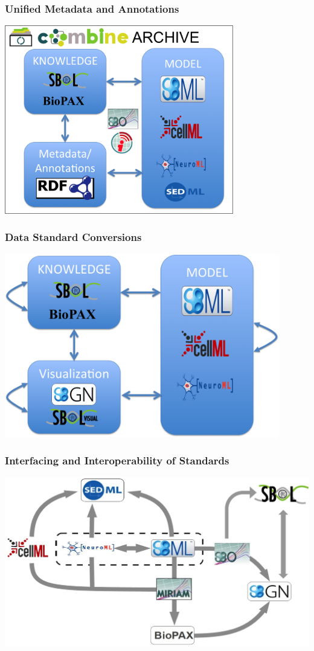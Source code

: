 \documentclass{beamer}
\begin{document}
\begin{frame}\frametitle{Unified Metadata and Annotations}
	\begin{center}
	\includegraphics[width=0.75\textwidth]{figs/annotations}
	\end{center}
\end{frame}

\begin{frame}\frametitle{Data Standard Conversions}
	\begin{center}
	\includegraphics[width=0.9\textwidth]{figs/Conversions}
	\end{center}
\end{frame}

\begin{frame}\frametitle{Interfacing and Interoperability of Standards}
\begin{center}
\includegraphics[width=\textwidth]{figs/interoperability}
\end{center}
\end{frame}
\end{document}
